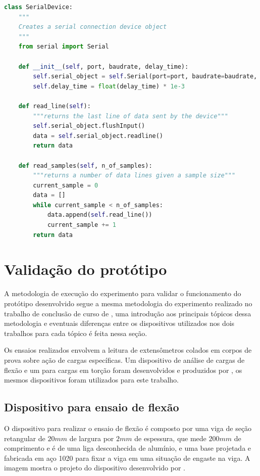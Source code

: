 \begin{lstlisting}[language=Python,caption={[SerialDevice]{Objeto SerialDevice}}]
class SerialDevice:
    """
    Creates a serial connection device object
    """
    from serial import Serial

    def __init__(self, port, baudrate, delay_time):
        self.serial_object = self.Serial(port=port, baudrate=baudrate, timeout=1)
        self.delay_time = float(delay_time) * 1e-3

    def read_line(self):
        """returns the last line of data sent by the device"""
        self.serial_object.flushInput()
        data = self.serial_object.readline()
        return data

    def read_samples(self, n_of_samples):
        """returns a number of data lines given a sample size"""
        current_sample = 0
        data = []
        while current_sample < n_of_samples:
            data.append(self.read_line())
            current_sample += 1
        return data
\end{lstlisting}



\section{Validação do protótipo}

A metodologia de execução do experimento para validar o funcionamento do protótipo desenvolvido segue a mesma metodologia do experimento realizado no trabalho de conclusão
de curso de \autocite{Minela2017}, uma introdução aos principais tópicos dessa metodologia e eventuais diferenças entre os dispositivos utilizados nos dois trabalhos para cada tópico é feita nessa seção.

Os ensaios realizados envolvem a leitura de extensômetros colados em corpos de prova sobre ação de cargas específicas. Um dispositivo de análise de cargas de flexão e
um para cargas em torção foram desenvolvidos e produzidos por \autocite{Minela2017}, os mesmos dispositivos foram utilizados para este trabalho.

\subsection{Dispositivo para ensaio de flexão}

O dispositivo para realizar o ensaio de flexão é composto por uma viga de seção retangular de $20mm$ de largura por $2mm$ de espessura, que mede $200mm$
de comprimento e é de uma liga desconhecida de alumínio, e uma base projetada e fabricada em aço 1020 para fixar a viga em uma situação de engaste na viga.
A imagem mostra o projeto do dispositivo desenvolvido por \autocite{Minela2017}.

